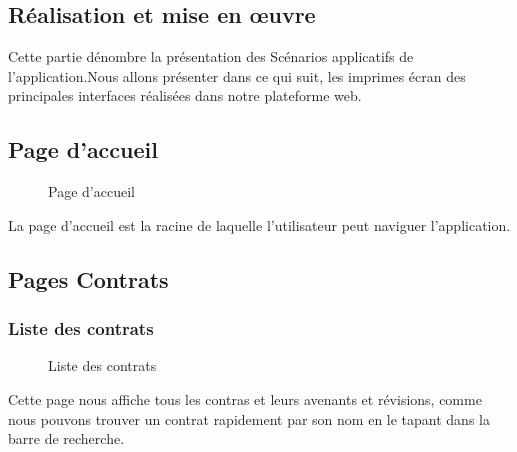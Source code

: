 \documentclass[a4paper]{report}
\begin{document}
\begin{doublespace}
	\chapter{Réalisation et mise en œuvre}
	\fancyhead[L]{\hspace*{5cm}}
	Cette partie dénombre la présentation des Scénarios applicatifs de l’application.Nous allons présenter dans  ce  qui  suit,  les  imprimes écran des principales interfaces réalisées dans notre plateforme web.

	\section{Page d'accueil}
	\begin{figure}[H]
		\begin{center}
			\caption{Page d'accueil}
		\end{center}
	\end{figure}
	La page d'accueil est la racine de laquelle l'utilisateur peut naviguer l'application.
	\section{Pages Contrats}
	\subsection{Liste des contrats}
	\begin{figure}[H]
		\begin{center}
			\caption{Liste des contrats}
		\end{center}
	\end{figure}
	Cette page nous affiche tous les contras et leurs avenants et révisions, comme nous pouvons trouver un contrat rapidement par son nom en le tapant dans la barre de recherche.

\end{doublespace}
\end{document}
